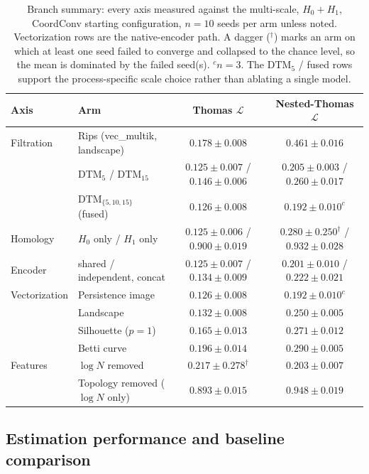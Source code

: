 \documentclass[11pt,a4paper]{article}
\begin{document}
\begin{table}[tbp]
\centering
\footnotesize
\begin{tabular}{llcc}
\toprule
Axis & Arm & Thomas $\mathcal{L}$ & Nested-Thomas $\mathcal{L}$ \\
\midrule
Filtration & Rips (vec\_multik, landscape) & $0.178 \pm 0.008$ & $0.461 \pm 0.016$ \\
           & DTM$_5$ / DTM$_{15}$ & $0.125 \pm 0.007$ / $0.146 \pm 0.006$ & $0.205 \pm 0.003$ / $0.260 \pm 0.017$ \\
           & DTM$_{\{5,10,15\}}$ (fused) & $0.126 \pm 0.008$ & $0.192 \pm 0.010^{c}$ \\
Homology   & $H_0$ only / $H_1$ only & $0.125 \pm 0.006$ / $0.900 \pm 0.019$ & $0.280 \pm 0.250^\dagger$ / $0.932 \pm 0.028$ \\
Encoder    & shared / independent, concat & $0.125 \pm 0.007$ / $0.134 \pm 0.009$ & $0.201 \pm 0.010$ / $0.222 \pm 0.021$ \\
Vectorization & Persistence image & $0.126 \pm 0.008$ & $0.192 \pm 0.010^{c}$ \\
           & Landscape & $0.132 \pm 0.008$ & $0.250 \pm 0.005$ \\
           & Silhouette ($p=1$) & $0.165 \pm 0.013$ & $0.271 \pm 0.012$ \\
           & Betti curve & $0.196 \pm 0.014$ & $0.290 \pm 0.005$ \\
Features   & $\log N$ removed & $0.217 \pm 0.278^\dagger$ & $0.203 \pm 0.007$ \\
           & Topology removed ($\log N$ only) & $0.893 \pm 0.015$ & $0.948 \pm 0.019$ \\
\bottomrule
\end{tabular}
\caption{Branch summary: every axis measured against the multi-scale,
$H_0{+}H_1$, CoordConv starting configuration, $n=10$ seeds per arm unless
noted. Vectorization rows are the native-encoder path. A dagger ($^\dagger$)
marks an arm on which at least one seed failed to converge and collapsed to the
chance level, so the mean is dominated by the failed seed(s).
$^{c}$$n=3$. The DTM$_5$ / fused rows support the process-specific scale choice
rather than ablating a single model.}
\label{tab:branches}
\end{table}

\subsection{Estimation performance and baseline comparison}
\label{ssec:results}
\end{document}
